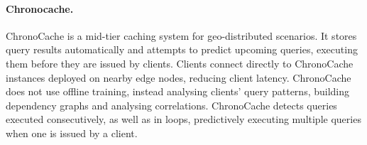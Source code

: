 %
%


\paragraph{Chronocache.} ChronoCache \cite{chronocache} is a mid-tier caching system for geo-distributed scenarios.
It stores query results automatically and attempts to predict upcoming queries, executing them before they are issued by clients.
Clients connect directly to ChronoCache instances deployed on nearby edge nodes, reducing client latency.
ChronoCache does not use offline training, instead analysing clients' query patterns, building dependency graphs and analysing correlations.
ChronoCache detects queries executed consecutively, as well as in loops, predictively executing multiple queries when one is issued by a client.

